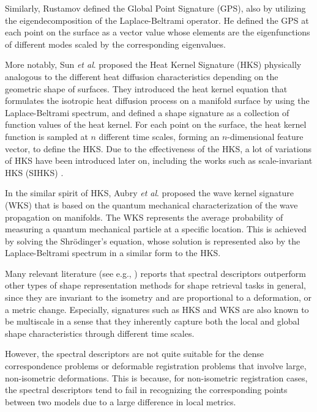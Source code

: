 \documentclass[5p,twocolumn,10pt,times]{elsarticle}
\begin{document}
Similarly, Rustamov \cite{rustamov2007laplace} defined the Global Point Signature (GPS), also by utilizing the eigendecomposition of the Laplace-Beltrami operator. He defined the GPS at each point on the surface as a vector value whose elements are the eigenfunctions of different modes scaled by the corresponding eigenvalues.

More notably, Sun \textit{et al}. \cite{sun2009concise} proposed the Heat Kernel Signature (HKS) physically analogous to the different heat diffusion characteristics depending on the geometric shape of surfaces. They introduced the heat kernel equation that formulates the isotropic heat diffusion process on a manifold surface by using the Laplace-Beltrami spectrum, and defined a shape signature as a collection of function values of the heat kernel. For each point on the surface, the heat kernel function is sampled at $n$ different time scales, forming an $n$-dimensional feature vector, to define the HKS. Due to the effectiveness of the HKS, a lot of variations of HKS have been introduced later on, including the works such as scale-invariant HKS (SIHKS) \cite{bronstein2010scale}.

In the similar spirit of HKS, Aubry \textit{et al}. \cite{aubry2011wave} proposed the wave kernel signature (WKS) that is based on the quantum mechanical characterization of the wave propagation on manifolds. The WKS represents the average probability of measuring a quantum mechanical particle at a specific location. This is achieved by solving the Shr\"{o}dinger's equation, whose solution is represented also by the Laplace-Beltrami spectrum in a similar form to the HKS.

Many relevant literature (see e.g., \cite{li2014spatially,lian2013comparison}) reports that spectral descriptors outperform other types of shape representation methods for shape retrieval tasks in general, since they are invariant to the isometry and are proportional to a deformation, or a metric change. Especially, signatures such as HKS and WKS are also known to be multiscale in a sense that they inherently capture both the local and global shape characteristics through different time scales.

However, the spectral descriptors are not quite suitable for the dense correspondence problems or deformable registration problems that involve large, non-isometric deformations. This is because, for non-isometric registration cases, the spectral descriptors tend to fail in recognizing the corresponding points between two models due to a large difference in local metrics. 
\end{document}
